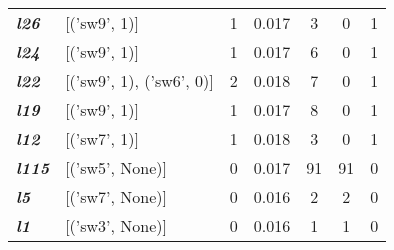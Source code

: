 \begin{table}
\begin{tabular}{llccccc}
    \textit{\textbf{l26}}                                            & {[}('sw9', 1){]}             & 1             & 0.017              & 3              & 0              & 1           \\
    \textit{\textbf{l24}}                                            & {[}('sw9', 1){]}             & 1             & 0.017              & 6              & 0              & 1           \\
    \textit{\textbf{l22}}                                            & {[}('sw9', 1), ('sw6', 0){]} & 2             & 0.018              & 7              & 0              & 1           \\
    \textit{\textbf{l19}}                                            & {[}('sw9', 1){]}             & 1             & 0.017              & 8              & 0              & 1           \\
    \textit{\textbf{l12}}                                            & {[}('sw7', 1){]}             & 1             & 0.018              & 3              & 0              & 1           \\
    \textit{\textbf{l115}}                                           & {[}('sw5', None){]}          & 0             & 0.017              & 91             & 91             & 0           \\
    \textit{\textbf{l5}}                                             & {[}('sw7', None){]}          & 0             & 0.016              & 2              & 2              & 0           \\
    \textit{\textbf{l1}}                                             & {[}('sw3', None){]}          & 0             & 0.016              & 1              & 1              & 0           \\ \hline
    \end{tabular}
    \end{table}